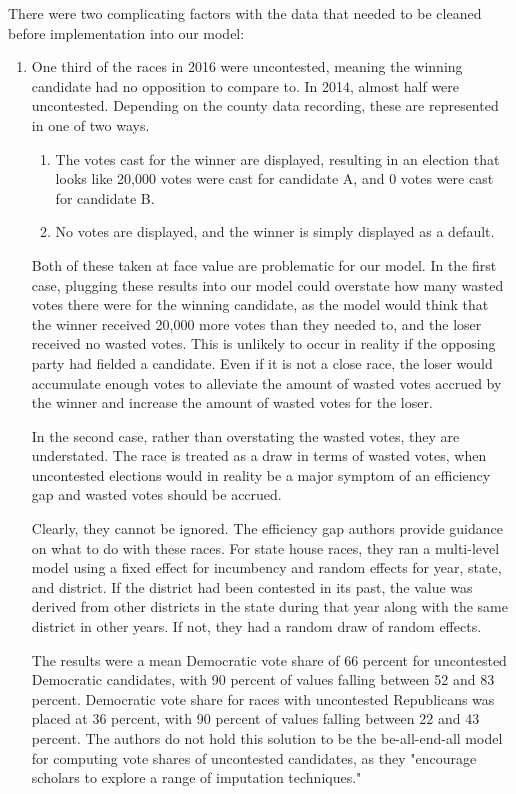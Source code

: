 \documentclass[sigconf]{acmart}
\begin{document}
There were two complicating factors with the data that needed to be cleaned before implementation into our model:
\begin{enumerate}
    \item One third of the races in 2016 were uncontested, meaning the winning candidate had no opposition to compare to. In 2014, almost half were uncontested. Depending on the county data recording, these are represented in one of two ways. 
        \begin{enumerate}
            \item The votes cast for the winner are displayed, resulting in an election that looks like 20,000 votes were cast for candidate A, and 0 votes were cast for candidate B.
            \item No votes are displayed, and the winner is simply displayed as a default.
        \end{enumerate}
    Both of these taken at face value are problematic for our model. In the first case, plugging these results into our model could overstate how many wasted votes there were for the winning candidate, as the model would think that the winner received 20,000 more votes than they needed to, and the loser received no wasted votes. This is unlikely to occur in reality if the opposing party had fielded a candidate. Even if it is not a close race, the loser would accumulate enough votes to alleviate the amount of wasted votes accrued by the winner and increase the amount of wasted votes for the loser. 
    
    In the second case, rather than overstating the wasted votes, they are understated. The race is treated as a draw in terms of wasted votes, when uncontested elections would in reality be a major symptom of an efficiency gap and wasted votes should be accrued. 
    
    Clearly, they cannot be ignored. The efficiency gap authors provide guidance on what to do with these races. For state house races, they ran a multi-level model using a fixed effect for incumbency and random effects for year, state, and district. If the district had been contested in its past, the value was derived from other districts in the state during that year along with the same district in other years. If not, they had a random draw of random effects. \cite{chicagouncontested}
    
    The results were a mean Democratic vote share of 66 percent for uncontested Democratic candidates, with 90 percent of values falling between 52 and 83 percent. Democratic vote share for races with uncontested Republicans was placed at 36 percent, with 90 percent of values falling between 22 and 43 percent. The authors do not hold this solution to be the be-all-end-all model for computing vote shares of uncontested candidates, as they "encourage scholars to explore a range of imputation techniques."\cite{chicagouncontested}
    

\end{enumerate}
\end{document}
